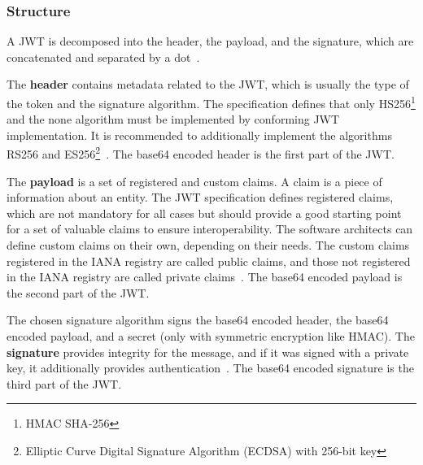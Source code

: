 \subsubsection{Structure}
A JWT is decomposed into the header, the payload, and the signature, which are concatenated and separated by a dot~\cite{jwtdocauth0}.

The \textbf{header} contains metadata related to the JWT, which is usually the type of the token and the signature algorithm.
The specification defines that only HS256\footnote{HMAC SHA-256} and the none algorithm must be implemented by conforming JWT implementation.
It is recommended to additionally implement the algorithms RS256 and ES256\footnote{Elliptic Curve Digital Signature Algorithm (ECDSA) with 256-bit key}~\cite{jwtdocauth0, jwtrfc}.
The base64 encoded header is the first part of the JWT.

The \textbf{payload} is a set of registered and custom claims.
A claim is a piece of information about an entity.
The JWT specification defines registered claims, which are not mandatory for all cases but should provide a good starting point for a set of valuable claims to ensure interoperability.
The software architects can define custom claims on their own, depending on their needs.
The custom claims registered in the IANA registry are called public claims, and those not registered in the IANA registry are called private claims~\cite{jwtdocauth0, jwtrfc}.
The base64 encoded payload is the second part of the JWT.

The chosen signature algorithm signs the base64 encoded header, the base64 encoded payload, and a secret (only with symmetric encryption like HMAC).
The \textbf{signature} provides integrity for the message, and if it was signed with a private key, it additionally provides authentication~\cite{jwtdocauth0}.
The base64 encoded signature is the third part of the JWT.

